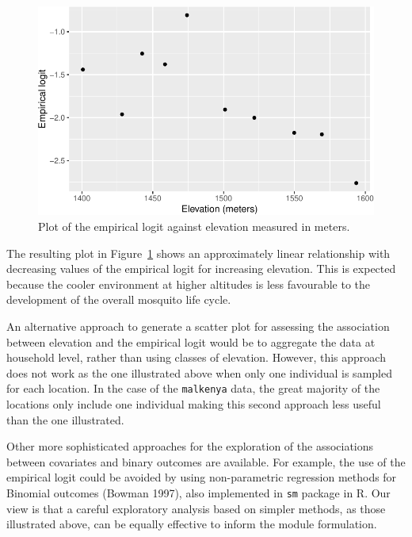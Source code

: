 \documentclass[
  letterpaper,
]{krantz}
\begin{document}
\begin{figure}[H]

{\centering \includegraphics{03_model-fitting_files/figure-pdf/fig-elogit-elev-malkenya-1.pdf}

}

\caption{\label{fig-elogit-elev-malkenya}Plot of the empirical logit
against elevation measured in meters.}

\end{figure}

The resulting plot in Figure~\ref{fig-elogit-elev-malkenya} shows an
approximately linear relationship with decreasing values of the
empirical logit for increasing elevation. This is expected because the
cooler environment at higher altitudes is less favourable to the
development of the overall mosquito life cycle.

An alternative approach to generate a scatter plot for assessing the
association between elevation and the empirical logit would be to
aggregate the data at household level, rather than using classes of
elevation. However, this approach does not work as the one illustrated
above when only one individual is sampled for each location. In the case
of the \texttt{malkenya} data, the great majority of the locations only
include one individual making this second approach less useful than the
one illustrated.

Other more sophisticated approaches for the exploration of the
associations between covariates and binary outcomes are available. For
example, the use of the empirical logit could be avoided by using
non-parametric regression methods for Binomial outcomes (Bowman 1997),
also implemented in \texttt{sm} package in R. Our view is that a careful
exploratory analysis based on simpler methods, as those illustrated
above, can be equally effective to inform the module formulation.
\end{document}
